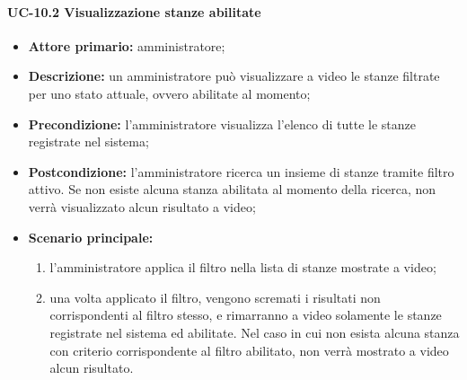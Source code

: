 \paragraph{UC-10.2 Visualizzazione stanze abilitate}
\begin{itemize}
    \item \textbf{Attore primario:} amministratore;
    \item \textbf{Descrizione:} un amministratore pu\`{o} visualizzare a video le stanze filtrate per uno stato attuale, ovvero abilitate al momento;
    \item \textbf{Precondizione:} l'amministratore visualizza l'elenco di tutte le stanze registrate nel sistema;
    \item \textbf{Postcondizione:} l'amministratore ricerca un insieme di stanze tramite filtro attivo. Se non esiste alcuna stanza abilitata al momento della ricerca, non verrà visualizzato alcun risultato a video;
    \item \textbf{Scenario principale:}
    \begin{enumerate}
        \item l'amministratore applica il filtro nella lista di stanze mostrate a video;
        \item una volta applicato il filtro, vengono scremati i risultati non corrispondenti al filtro stesso, e rimarranno a video solamente le stanze registrate nel sistema ed abilitate. Nel caso in cui non esista alcuna stanza con criterio corrispondente al filtro abilitato, non verrà mostrato a video alcun risultato.
    \end{enumerate}
\end{itemize}


